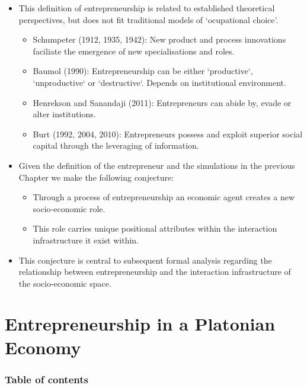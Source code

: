 \documentclass[10pt]{beamer}
\begin{document}
\begin{frame}
\begin{itemize}
\item This definition of entrepreneurship is related to established theoretical perspectives, but does not fit traditional models of `ocupational choice'.
\begin{itemize}
\medskip
\item Schumpeter (1912, 1935, 1942): New product and process innovations faciliate the emergence of new specialisations and roles.
\medskip
\item Baumol (1990): Entrepreneurship can be either `productive`, `unproductive` or `destructive`. Depends on institutional environment.
\medskip
\item Henrekson and Sanandaji (2011): Entrepreneurs can abide by, evade or alter institutions.
\medskip
\item Burt (1992, 2004, 2010): Entrepreneurs possess and exploit superior social capital through the leveraging of information.
\end{itemize}
\end{itemize}
\end{frame}


\begin{frame}
\begin{itemize}
\item Given the definition of the entrepreneur and the simulations in the previous Chapter we make the following conjecture:
\begin{itemize}
\medskip
\item Through a process of entrepreneurship an economic agent creates a new socio-economic role.
\medskip
\item This role carries unique positional attributes within the interaction infrastructure it exist within.
\end{itemize}
\medskip
\item This conjecture is central to subsequent formal analysis regarding the relationship between entrepreneurship and the interaction infrastructure of the socio-economic space.
\end{itemize}
\end{frame}

\section{Entrepreneurship in a Platonian Economy}

\begin{frame}
\frametitle{Table of contents}
\tableofcontents[currentsection]
\end{frame}
\end{document}

